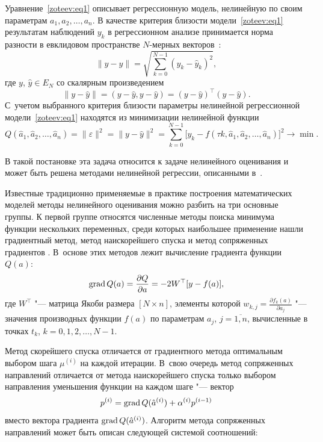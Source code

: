Уравнение~\eqref{zoteev:eq1} описывает регрессионную модель, нелинейную по своим параметрам $a_1,a_2, \dots, a_n$. В качестве критерия близости модели~\eqref{zoteev:eq1} результатам наблюдений  $y_k$ в регрессионном анализе принимается норма разности   в евклидовом пространстве  $N$-мерных векторов~\cite{zot:2,zot:3}:
$$\|y-\hat{y}\|=\sqrt{\sum_{k=0}^{N-1} (y_k-\hat{y}_k)^2},$$
где  $y$, $\hat{y} \in E_N$  со скалярным произведением $$\|y-\hat{y}\|=(y-\hat{y}, y-\hat{y})=(y-\hat{y})^{\top}(y-\hat{y}).$$ 
С~учетом выбранного критерия близости параметры нелинейной регрессионной модели~\eqref{zoteev:eq1} находятся из минимизации нелинейной функции 
\begin{equation}
Q(\hat{a}_1,\hat{a}_2,\dots,\hat{a}_n)=\|\varepsilon\|^2 =\|y-\hat{y}\|^2=\sum_{k=0}^{N-1}
\bigl[y_k-f(\tau k,\hat{a}_1,\hat{a}_2,\dots,\hat{a}_n)\bigr]^2 \to \min.
\label{zoteev:eq2}
\end{equation}	

В такой постановке эта задача относится к задаче нелинейного оценивания и может быть решена методами нелинейной регрессии, описанными в~\cite{zot:1,zot:2,zot:3,zot:4,zot:5,zot:6}.


\smallskip

Известные традиционно применяемые в практике построения математических моделей методы нелинейного оценивания можно разбить на три основные группы. К первой группе относятся численные методы поиска минимума функции нескольких переменных, среди которых наибольшее применение нашли градиентный метод, метод наискорейшего спуска и метод сопряженных градиентов \cite{zot:3,zot:10}. 
В~основе этих методов лежит вычисление градиента функции $Q(a)$: 
$$
\mathop{\rm grad} Q(a)=\dfrac{\partial Q}{\partial a}=-2W^{\top}[y-f(a)],
$$ 
где $W^{\top}$ "--- матрица Якоби размера $[N {\times} n]$, элементы которой $w_{k,j}=\frac{\partial f_k(a)}{\partial a_j}$ "--- значения производных функции $f(a)$ по параметрам  $a_j$, $j=\overline{1,n}$, вычисленные в точках  $t_k$, $k=0,1,2,\dots,N-1$.  

Метод скорейшего спуска отличается от градиентного метода оптимальным выбором шага $\mu^{(i)}$ на каждой итерации. 
В~свою очередь метод сопряженных направлений отличается от метода наискорейшего спуска только выбором направления уменьшения функции на каждом шаге "--- 
вектор $$p^{(i)}=\mathop{\rm grad} Q (\hat{a}^{(i)})+\alpha^{(i)}p^{(i-1)}$$ вместо вектора градиента $\mathop{\rm grad} Q(\hat{a}^{(i)})$. 
Алгоритм метода сопряженных направлений может быть описан следующей системой соотношений:

